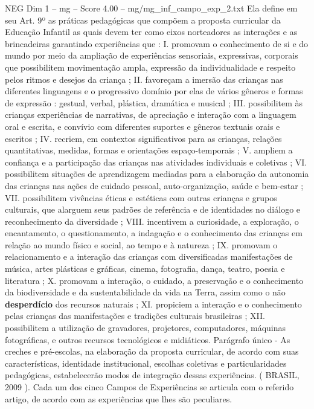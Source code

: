 \begin{textsample}{NEG Dim 1 – mg – Score 4.00 – mg/mg\_inf\_campo\_exp\_2.txt}
Ela define em seu Art. 9º as práticas pedagógicas que compõem a proposta curricular da Educação Infantil as quais devem ter como eixos norteadores as interações e as brincadeiras garantindo experiências que : I. promovam o conhecimento de si e do mundo por meio da ampliação de experiências sensoriais, expressivas, corporais que possibilitem movimentação ampla, expressão da individualidade e respeito pelos ritmos e desejos da criança ; II. favoreçam a imersão das crianças nas diferentes linguagens e o progressivo domínio por elas de vários gêneros e formas de expressão : gestual, verbal, plástica, dramática e musical ; III. possibilitem às crianças experiências de narrativas, de apreciação e interação com a linguagem oral e escrita, e convívio com diferentes suportes e gêneros textuais orais e escritos ; IV. recriem, em contextos significativos para as crianças, relações quantitativas, medidas, formas e orientações espaço-temporais ; V. ampliem a confiança e a participação das crianças nas atividades individuais e coletivas ; VI. possibilitem situações de aprendizagem mediadas para a elaboração da autonomia das crianças nas ações de cuidado pessoal, auto-organização, saúde e bem-estar ; VII. possibilitem vivências éticas e estéticas com outras crianças e grupos culturais, que alarguem seus padrões de referência e de identidades no diálogo e reconhecimento da diversidade ; VIII. incentivem a curiosidade, a exploração, o encantamento, o questionamento, a indagação e o conhecimento das crianças em relação ao mundo físico e social, ao tempo e à natureza ; IX. promovam o relacionamento e a interação das crianças com diversificadas manifestações de música, artes plásticas e gráficas, cinema, fotografia, dança, teatro, poesia e literatura ; X. promovam a interação, o cuidado, a preservação e o conhecimento da biodiversidade e da sustentabilidade da vida na Terra, assim como o não \textbf{desperdício} dos recursos naturais ; XI. propiciem a interação e o conhecimento pelas crianças das manifestações e tradições culturais brasileiras ; XII. possibilitem a utilização de gravadores, projetores, computadores, máquinas fotográficas, e outros recursos tecnológicos e midiáticos.
Parágrafo único - As creches e pré-escolas, na elaboração da proposta curricular, de acordo com suas características, identidade institucional, escolhas coletivas e particularidades pedagógicas, estabelecerão modos de integração dessas experiências. ( BRASIL, 2009 ).
Cada um dos cinco Campos de Experiências se articula com o referido artigo, de acordo com as experiências que lhes são peculiares.

\end{textsample}

